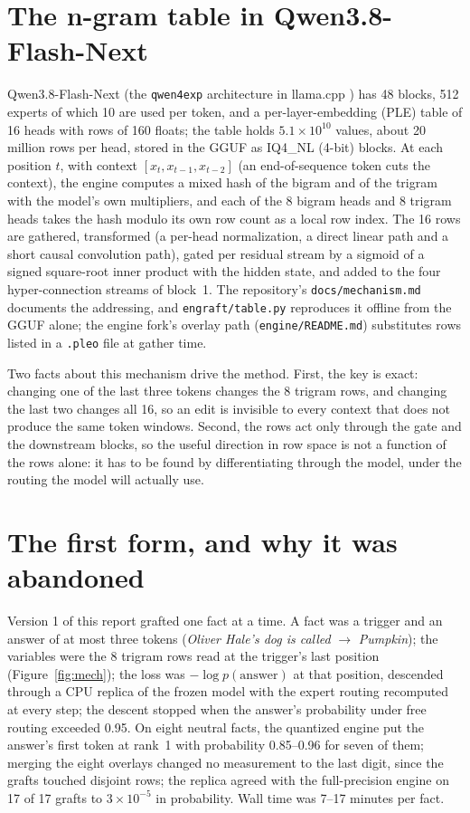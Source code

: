\documentclass[10pt,a4paper]{article}
\begin{document}
\section{The n-gram table in Qwen3.8-Flash-Next}
\label{sec:mech}

Qwen3.8-Flash-Next (the \texttt{qwen4exp} architecture in llama.cpp \cite{pr27742}) has 48
blocks, 512 experts of which 10 are used per token, and a per-layer-embedding (PLE) table
of 16 heads with rows of 160 floats; the table holds $5.1\times10^{10}$ values, about
20 million rows per head, stored in the GGUF as IQ4\_NL (4-bit) blocks. At each position
$t$, with context $[x_t, x_{t-1}, x_{t-2}]$ (an end-of-sequence token cuts the context),
the engine computes a mixed hash of the bigram and of the trigram with the model's own
multipliers, and each of the 8 bigram heads and 8 trigram heads takes the hash modulo its
own row count as a local row index. The 16 rows are gathered, transformed (a per-head
normalization, a direct linear path and a short causal convolution path), gated per
residual stream by a sigmoid of a signed square-root inner product with the hidden state,
and added to the four hyper-connection streams of block~1. The repository's
\texttt{docs/mechanism.md} documents the addressing, and \texttt{engraft/table.py}
reproduces it offline from the GGUF alone; the engine fork's overlay path
(\texttt{engine/README.md}) substitutes rows listed in a \texttt{.pleo} file at gather
time.

Two facts about this mechanism drive the method. First, the key is exact: changing one
of the last three tokens changes the 8 trigram rows, and changing the last two changes all
16, so an edit is invisible to every context that does not produce the same token windows.
Second, the rows act only through the gate and the downstream blocks, so the useful
direction in row space is not a function of the rows alone: it has to be found by
differentiating through the model, under the routing the model will actually use.

\section{The first form, and why it was abandoned}
\label{sec:v1}

Version 1 of this report grafted one fact at a time. A fact was a trigger and an answer of
at most three tokens (\emph{Oliver Hale's dog is called} $\to$ \emph{Pumpkin}); the
variables were the 8 trigram rows read at the trigger's last position (Figure~\ref{fig:mech});
the loss was $-\log p(\text{answer})$ at that position, descended through a CPU replica of
the frozen model with the expert routing recomputed at every step; the descent stopped when
the answer's probability under free routing exceeded 0.95. On eight neutral facts, the
quantized engine put the answer's first token at rank~1 with probability 0.85--0.96 for
seven of them; merging the eight overlays changed no measurement to the last digit, since
the grafts touched disjoint rows; the replica agreed with the full-precision engine on
17 of 17 grafts to $3\times10^{-5}$ in probability. Wall time was 7--17 minutes per fact.
\end{document}
